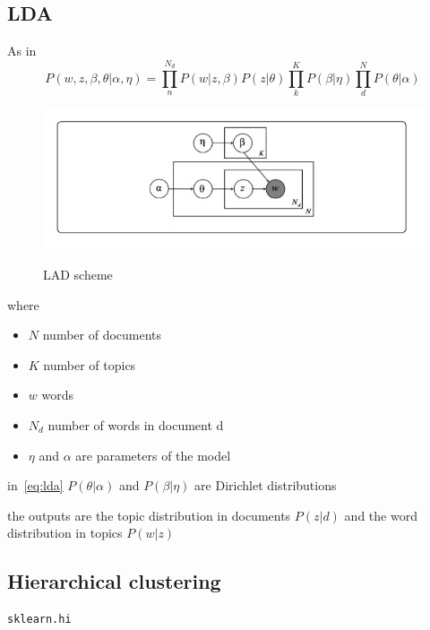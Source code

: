 \subsection{LDA}

As in ~\cite{Zhou2016}
\begin{equation}\label{eq:lda}
  P(w, z,\beta, \theta| \alpha, \eta)=\prod_n^{N_d} P(w|z,\beta)P(z|\theta)\prod_k^KP(\beta|\eta)\prod_d^N P(\theta | \alpha)
\end{equation}

\begin{figure}
  \centering
  \includegraphics[width=0.5\linewidth]{pictures/topic/LDA.jpeg}
  \label{fig:LDA}
  \caption{LAD scheme}
\end{figure}

where

\begin{itemize}
  \item $N$ number of documents
  \item $K$ number of topics
  \item $w$ words
  \item $N_d$ number of words in document d
  \item $\eta$ and $\alpha$ are parameters of the model
\end{itemize}

in~\ref{eq:lda} $P(\theta | \alpha)$ and $P(\beta|\eta)$ are Dirichlet distributions

the outputs are the topic distribution in documents $P(z|d)$ and the word distribution in topics $P(w|z)$

\subsection{Hierarchical clustering}

\begin{lstlisting}
sklearn.hi
\end{lstlisting}


